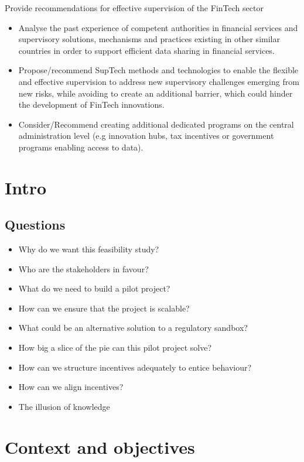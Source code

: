 \documentclass[
]{book}
\begin{document}
Provide recommendations for effective supervision of the FinTech sector

\begin{itemize}
\item
  Analyse the past experience of competent authorities in financial services and supervisory solutions, mechanisms and practices existing in other similar countries in order to support efficient data sharing in financial services.
\item
  Propose/recommend SupTech methods and technologies to enable the flexible and effective supervision to address new supervisory challenges emerging from new risks, while avoiding to create an additional barrier, which could hinder the development of FinTech innovations.
\item
  Consider/Recommend creating additional dedicated programs on the central administration level (e.g innovation hubs, tax incentives or government programs enabling access to data).
\end{itemize}

\hypertarget{intro}{%
\chapter{Intro}\label{intro}}

\hypertarget{questions}{%
\section{Questions}\label{questions}}

\begin{itemize}
\item
  Why do we want this feasibility study?
\item
  Who are the stakeholders in favour?
\item
  What do we need to build a pilot project?
\item
  How can we ensure that the project is scalable?
\item
  What could be an alternative solution to a regulatory sandbox?
\item
  How big a slice of the pie can this pilot project solve?
\item
  How can we structure incentives adequately to entice behaviour?
\item
  How can we align incentives?
\item
  The illusion of knowledge
\end{itemize}

\hypertarget{context-and-objectives}{%
\chapter{Context and objectives}\label{context-and-objectives}}
\end{document}
